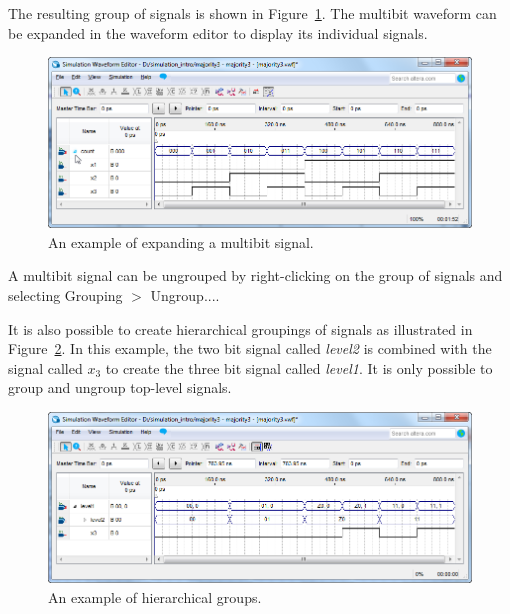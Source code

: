 \documentclass[11pt, twoside, pdftex]{article}
\begin{document}
The resulting group of signals is shown in Figure~\ref{fig:fig23}. The multibit waveform can be expanded 
in the waveform editor to display its individual signals. 
\begin{figure}[H]
   \begin{center}
      \includegraphics[scale=0.65]{figures/appendix/figure23.png}
   \caption{An example of expanding a multibit signal.} 
	 \label{fig:fig23}
	 \end{center}
\end{figure}
A multibit signal can be ungrouped by right-clicking on the group of signals and selecting {\sf Grouping $>$ Ungroup...}.

It is also possible to create hierarchical groupings of signals as illustrated in Figure~\ref{fig:fig24}. In this example, 
the two bit signal called {\it level2} is combined with the signal called $x_3$ to create the three bit signal called {\it level1}.
It is only possible to group and ungroup top-level signals.
\begin{figure}[H]
   \begin{center}
      \includegraphics[scale=0.65]{figures/appendix/figure24.png}
   \caption{An example of hierarchical groups.} 
	 \label{fig:fig24}
	 \end{center}
\end{figure}
\end{document}
